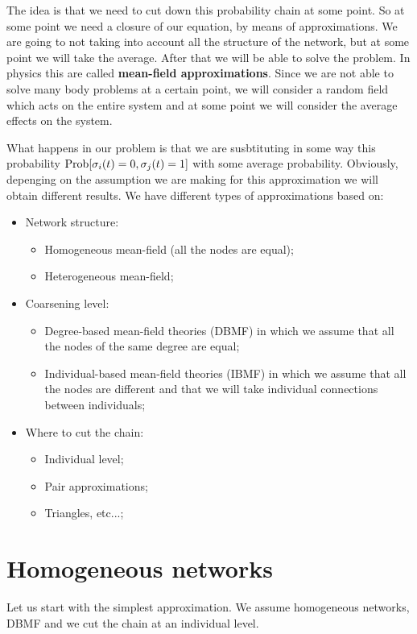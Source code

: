 \documentclass[../main/main.tex]{subfiles}
\begin{document}
The idea is that we need to cut down this probability chain at some point.
So at some point we need a closure of our equation, by means of approximations.
We are going to not taking into account all the structure of the network, but at some point we will take the average.
After that we will be able to solve the problem.
In physics this are called \textbf{mean-field approximations}. Since we are not able to solve many body problems at a certain point, we will consider a random field which acts on the entire system and at some point we will consider the average effects on the system.

What happens in our problem is that we are susbtituting in some way this probability \( \text{Prob} \qty[\sigma _i (t) = 0, \sigma _j (t ) =1 ]  \) with some average probability.
Obviously, depenging on the assumption we are making for this approximation we will obtain different results.
We have different types of approximations based on:
\begin{itemize}
\item Network structure:
    \begin{itemize}
    \item Homogeneous mean-field (all the nodes are equal);
    \item Heterogeneous mean-field;
    \end{itemize}
\item Coarsening level:
    \begin{itemize}
    \item Degree-based mean-field theories (DBMF) in which we assume that all the nodes of the same degree are equal;
    \item Individual-based mean-field theories (IBMF) in which we assume that all the nodes are different and that we will take individual connections between individuals;
    \end{itemize}
\item Where to cut the chain:
    \begin{itemize}
    \item Individual level;
    \item Pair approximations;
    \item Triangles, etc...;
    \end{itemize}
\end{itemize}


\section{Homogeneous networks}
Let us start with the simplest approximation. We assume homogeneous networks, DBMF and we cut the chain at an individual level.
\end{document}
